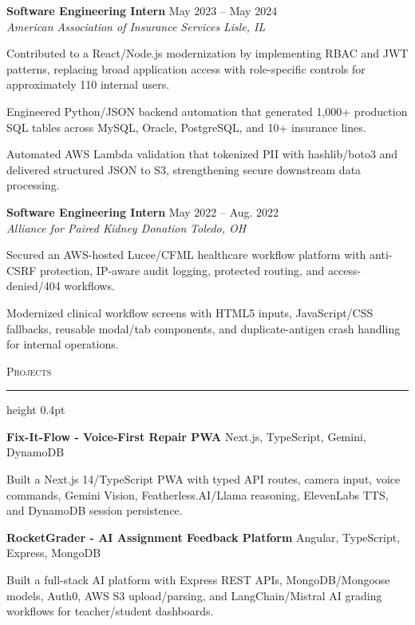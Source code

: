 \documentclass[letterpaper,11pt]{article}
\newcommand{\resumesection}[1]{%
  \par\vspace{2pt}%
  {\large\scshape #1}\par\vspace{2pt}%
  \hrule height 0.4pt\vspace{2pt}%
}
\newcommand{\resumeSubheading}[4]{
  \textbf{#1} \hfill #2\\
  \textit{#3} \hfill \textit{#4}
}
\newcommand{\projectHeading}[2]{
  \textbf{#1} \hfill #2
}
\begin{document}
\resumeSubheading
{Software Engineering Intern}{May 2023 -- May 2024}
{American Association of Insurance Services}{Lisle, IL}
\begin{tightitemize}
  \item Contributed to a React/Node.js modernization by implementing RBAC and JWT patterns, replacing broad application access with role-specific controls for approximately 110 internal users.
  \item Engineered Python/JSON backend automation that generated 1,000+ production SQL tables across MySQL, Oracle, PostgreSQL, and 10+ insurance lines.
  \item Automated AWS Lambda validation that tokenized PII with hashlib/boto3 and delivered structured JSON to S3, strengthening secure downstream data processing.
\end{tightitemize}

\resumeSubheading
{Software Engineering Intern}{May 2022 -- Aug. 2022}
{Alliance for Paired Kidney Donation}{Toledo, OH}
\begin{tightitemize}
  \item Secured an AWS-hosted Lucee/CFML healthcare workflow platform with anti-CSRF protection, IP-aware audit logging, protected routing, and access-denied/404 workflows.
  \item Modernized clinical workflow screens with HTML5 inputs, JavaScript/CSS fallbacks, reusable modal/tab components, and duplicate-antigen crash handling for internal operations.
\end{tightitemize}

\resumesection{Projects}
\projectHeading{Fix-It-Flow - Voice-First Repair PWA}{Next.js, TypeScript, Gemini, DynamoDB}
\begin{tightitemize}
  \item Built a Next.js 14/TypeScript PWA with typed API routes, camera input, voice commands, Gemini Vision, Featherless.AI/Llama reasoning, ElevenLabs TTS, and DynamoDB session persistence.
\end{tightitemize}

\projectHeading{RocketGrader - AI Assignment Feedback Platform}{Angular, TypeScript, Express, MongoDB}
\begin{tightitemize}
  \item Built a full-stack AI platform with Express REST APIs, MongoDB/Mongoose models, Auth0, AWS S3 upload/parsing, and LangChain/Mistral AI grading workflows for teacher/student dashboards.
\end{tightitemize}
\end{document}
